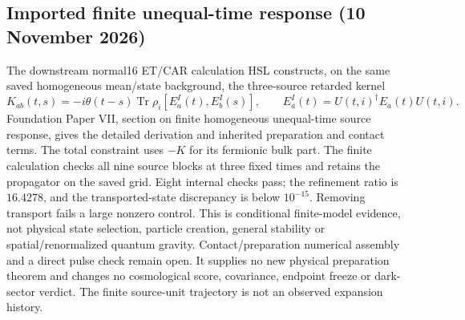 \documentclass[11pt]{article}
\begin{document}
\subsection{Imported finite unequal-time response (10 November 2026)}
The downstream normal16 ET/CAR calculation HSL constructs, on the same
saved homogeneous mean/state background, the three-source retarded kernel
\[
K_{ab}(t,s)=-i\theta(t-s)\operatorname{Tr}\rho_i
 [E_a^I(t),E_b^I(s)],\qquad E_a^I(t)=U(t,i)^\dagger E_a(t)U(t,i).
\]
Foundation Paper VII, section on finite homogeneous unequal-time source
response, gives the detailed derivation and inherited preparation and
contact terms. The total constraint uses $-K$ for its fermionic bulk part.
The finite calculation checks all nine source blocks at three fixed times
and retains the propagator on the saved grid. Eight internal checks pass;
the refinement ratio is $16.4278$, and the transported-state discrepancy is
below $10^{-15}$. Removing transport fails a large nonzero control.
This is conditional finite-model evidence, not physical state selection,
particle creation, general stability or spatial/renormalized quantum gravity.
Contact/preparation numerical assembly and a direct pulse check remain open.
It supplies no new physical preparation theorem and changes no cosmological
score, covariance, endpoint freeze or dark-sector verdict. The finite
source-unit trajectory is not an observed expansion history.
\end{document}
